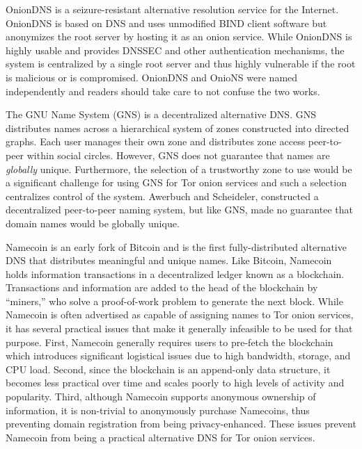 \documentclass[USenglish,oneside,twocolumn]{article}
\begin{document}
OnionDNS \cite{scaife2015oniondns} is a seizure-resistant alternative resolution service for the Internet. OnionDNS is based on DNS and uses unmodified BIND client software but anonymizes the root server by hosting it as an onion service. While OnionDNS is highly usable and provides DNSSEC and other authentication mechanisms, the system is centralized by a single root server and thus highly vulnerable if the root is malicious or is compromised. OnionDNS and OnioNS were named independently and readers should take care to not confuse the two works.

The GNU Name System \cite{wachs2014censorship} (GNS) is a decentralized alternative DNS. GNS distributes names across a hierarchical system of zones constructed into directed graphs. Each user manages their own zone and distributes zone access peer-to-peer within social circles. However, GNS does not guarantee that names are \emph{globally} unique. Furthermore, the selection of a trustworthy zone to use would be a significant challenge for using GNS for Tor onion services and such a selection centralizes control of the system. Awerbuch and Scheideler, \cite{awerbuch2004group} constructed a decentralized peer-to-peer naming system, but like GNS, made no guarantee that domain names would be globally unique.

Namecoin \cite{NamecoinHome} is an early fork of Bitcoin \cite{nakamoto2008bitcoin} and is the first fully-distributed alternative DNS that distributes meaningful and unique names. Like Bitcoin, Namecoin holds information transactions in a decentralized ledger known as a blockchain. Transactions and information are added to the head of the blockchain by ``miners,'' who solve a proof-of-work problem to generate the next block. While Namecoin is often advertised as capable of assigning names to Tor onion services, it has several practical issues that make it generally infeasible to be used for that purpose. First, Namecoin generally requires users to pre-fetch the blockchain which introduces significant logistical issues due to high bandwidth, storage, and CPU load. Second, since the blockchain is an append-only data structure, it becomes less practical over time and scales poorly to high levels of activity and popularity. Third, although Namecoin supports anonymous ownership of information, it is non-trivial to anonymously purchase Namecoins, thus preventing domain registration from being privacy-enhanced. These issues prevent Namecoin from being a practical alternative DNS for Tor onion services. 
\end{document}
